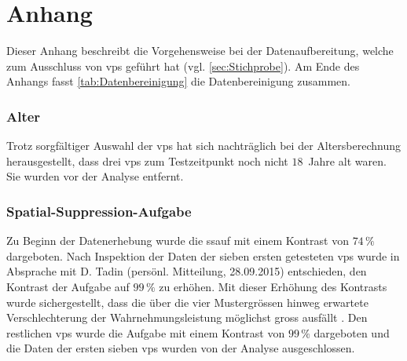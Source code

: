 \documentclass[11pt, twoside, a4paper]{book}		%
\begin{document}

\appendix
\setcounter{figure}{0}
\renewcommand\thefigure{\Alph{appndx}\@arabic\c@figure}

\chapter[Anhang: Datenaufbereitung]{Anhang \label{cha:Anhang_A}}
\setcounter{table}{0}
\renewcommand{\thetable}{A\arabic{table}}

Dieser Anhang beschreibt die Vorgehensweise bei der Datenaufbereitung, welche zum Ausschluss von \glspl{vp} geführt hat (vgl. \autoref{sec:Stichprobe}). Am Ende des Anhangs fasst \autoref{tab:Datenbereinigung} die Datenbereinigung zusammen.

\subsection*{Alter}
Trotz sorgfältiger Auswahl der \glspl{vp} hat sich nachträglich bei der Altersberechnung herausgestellt, dass drei \glspl{vp} zum Testzeitpunkt noch nicht $18$~Jahre alt waren. Sie wurden vor der Analyse entfernt.

\subsection*{Spatial-Suppression-Aufgabe}
Zu Beginn der Datenerhebung wurde die \gls{ssauf} mit einem Kontrast von $74\,\%$ dargeboten. Nach Inspektion der Daten der sieben ersten getesteten \glspl{vp} wurde in Absprache mit D. Tadin (persönl. Mitteilung, 28.09.2015) entschieden, den Kontrast der Aufgabe auf $99\,\%$ zu erhöhen. Mit dieser Erhöhung des Kontrasts wurde sichergestellt, dass die über die vier Mustergrössen hinweg erwartete Verschlechterung der Wahrnehmungsleistung möglichst gross ausfällt \citep[für den Zusammenhang zwischen Kontrast und Wahrnehmungsleistung siehe][]{Tadin2003}. Den restlichen \glspl{vp} wurde die Aufgabe mit einem Kontrast von $99\,\%$ dargeboten und die Daten der ersten sieben \glspl{vp} wurden von der Analyse ausgeschlossen.
\end{document}
